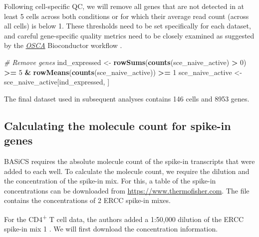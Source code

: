 \documentclass[9pt,a4paper,]{extarticle}
\newenvironment{Shaded}{\begin{snugshade}}{\end{snugshade}}
\newcommand{\CommentTok}[1]{\textcolor[rgb]{0.56,0.35,0.01}{\textit{#1}}}
\newcommand{\DecValTok}[1]{\textcolor[rgb]{0.00,0.00,0.81}{#1}}
\newcommand{\KeywordTok}[1]{\textcolor[rgb]{0.13,0.29,0.53}{\textbf{#1}}}
\newcommand{\NormalTok}[1]{#1}
\newcommand{\OperatorTok}[1]{\textcolor[rgb]{0.81,0.36,0.00}{\textbf{#1}}}
\newcommand{\StringTok}[1]{\textcolor[rgb]{0.31,0.60,0.02}{#1}}
\begin{document}
Following cell-specific QC, we will remove all genes that are not detected in at
least 5 cells across both conditions or for which their average read count
(across all cells) is below 1.
These thresholds need to be set specifically for each dataset, and careful
gene-specific quality metrics need to be closely examined as suggested by the
\href{https://osca.bioconductor.org/}{\emph{OSCA}} Bioconductor workflow \citep{Amezquita2019}.

\begin{Shaded}
\begin{Highlighting}[]
\CommentTok{# Remove genes}
\NormalTok{ind_expressed <-}\StringTok{ }\KeywordTok{rowSums}\NormalTok{(}\KeywordTok{counts}\NormalTok{(sce_naive_active) }\OperatorTok{>}\StringTok{ }\DecValTok{0}\NormalTok{) }\OperatorTok{>=}\StringTok{ }\DecValTok{5} \OperatorTok{&}
\StringTok{  }\KeywordTok{rowMeans}\NormalTok{(}\KeywordTok{counts}\NormalTok{(sce_naive_active)) }\OperatorTok{>=}\StringTok{ }\DecValTok{1}
\NormalTok{sce_naive_active <-}\StringTok{ }\NormalTok{sce_naive_active[ind_expressed, ]}
\end{Highlighting}
\end{Shaded}

The final dataset used in subsequent analyses contains 146
cells and 8953 genes.

\hypertarget{calculating-the-molecule-count-for-spike-in-genes}{%
\subsection{Calculating the molecule count for spike-in genes}\label{calculating-the-molecule-count-for-spike-in-genes}}

BASiCS requires the absolute molecule count of the spike-in transcripts that
were added to each well. To calculate the molecule count, we require the
dilution and the concentration of the spike-in mix.
For this, a table of the spike-in concentrations can be downloaded from
\href{https://www.thermofisher.com/order/catalog/product/4456740}{https://www.thermofisher.com}.
The file contains the concentrations of 2 ERCC spike-in mixes.

For the CD4\textsuperscript{+} T cell data, the authors added a 1:50,000 dilution of the ERCC
spike-in mix 1 \citep{Martinez-jimenez2017}.
We will first download the concentration information.
\end{document}
